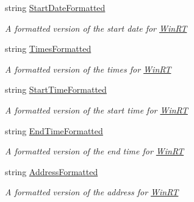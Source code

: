 \begin{DoxyCompactItemize}
string \hyperlink{class_field_service_1_1_data_1_1_assignment_a84d7b88bc21fba7b77d0f3924ae66c32}{Start\+Date\+Formatted}
\begin{DoxyCompactList}\small\item\em A formatted version of the start date for \hyperlink{namespace_field_service_1_1_win_r_t}{Win\+R\+T} \end{DoxyCompactList}\item 
string \hyperlink{class_field_service_1_1_data_1_1_assignment_a6460a1c1a2263373d55298ff6e66b746}{Times\+Formatted}
\begin{DoxyCompactList}\small\item\em A formatted version of the times for \hyperlink{namespace_field_service_1_1_win_r_t}{Win\+R\+T} \end{DoxyCompactList}\item 
string \hyperlink{class_field_service_1_1_data_1_1_assignment_a02c811e84c8dd8876e6e0a9b4f4981d2}{Start\+Time\+Formatted}
\begin{DoxyCompactList}\small\item\em A formatted version of the start time for \hyperlink{namespace_field_service_1_1_win_r_t}{Win\+R\+T} \end{DoxyCompactList}\item 
string \hyperlink{class_field_service_1_1_data_1_1_assignment_aea3afae0bbc681381087b2f2678df4da}{End\+Time\+Formatted}
\begin{DoxyCompactList}\small\item\em A formatted version of the end time for \hyperlink{namespace_field_service_1_1_win_r_t}{Win\+R\+T} \end{DoxyCompactList}\item 
string \hyperlink{class_field_service_1_1_data_1_1_assignment_a2ec62817dbecfc9307d655c6f3dd016c}{Address\+Formatted}
\begin{DoxyCompactList}\small\item\em A formatted version of the address for \hyperlink{namespace_field_service_1_1_win_r_t}{Win\+R\+T} \end{DoxyCompactList}\item 

\end{DoxyCompactItemize}
